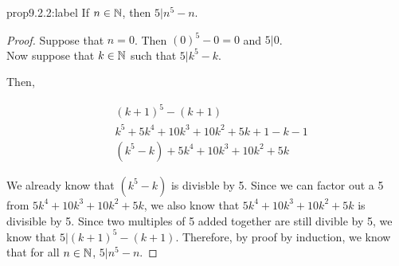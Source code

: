 \newpage
\begin{proposition}{prop9.2.2:label}
    If $n\in\mathbb{N}$, then $5|n^5-n$.
\end{proposition}


\begin{proof}
    Suppose that $n=0$. Then $(0)^5 - 0 = 0$ and $5|0$. \\

    Now suppose that $k \in\mathbb{N}$ such that $5|k^5-k$. 

    Then, 

    \[
    \begin{aligned}
        &(k+1)^5 - (k+1)\\
        &k^5+5k^4+10k^3+10k^2+5k+1-k-1\\
        &(k^5-k) + 5k^4+10k^3+10k^2+5k
    \end{aligned}    
    \]

    We already know that $(k^5-k)$ is divisble by 5. Since we can factor out a 5 from $5k^4+10k^3+10k^2+5k$, we also know that $5k^4+10k^3+10k^2+5k$ is divisible by 5. Since two multiples of 5 added together are still divible by 5, we know that $5|(k+1)^5 - (k+1)$. Therefore, by proof by induction, we know that for all $n\in\mathbb{N}$, $5|n^5-n$.
\end{proof}